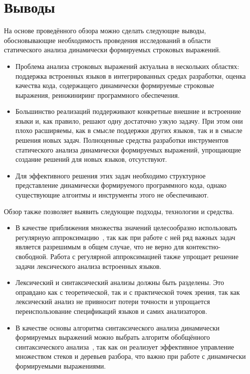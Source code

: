 \section{Выводы}

На основе проведённого обзора можно сделать следующие выводы, обосновывающие необходимость проведения исследований в области статического анализа динамически формируемых строковых выражений.

\begin{itemize}
    \item Проблема анализа строковых выражений актуальна в нескольких областях: поддержка встроенных языков в интегрированных средах разработки, оценка качества кода, содержащего динамически формируемые строковые выражения, реинжиниринг программного обеспечения.
    \item Большинство реализаций поддерживают конкретные внешние и встроенние языки и, как правило, решают одну достаточно узкую задачу. При этом они плохо расширяемы, как в смысле поддержки других языков, так и в смысле решения новых задач. Полноценные средства разработки инструментов статического анализа динамически формируемых выражений, упрощающие создание решений для новых языков, отсутствуют.
    \item Для эффективного решения этих задач необходимо структурное представление динамически формируемого программного кода, однако существующие алгоитмы и инструменты этого не обеспечивают.
\end{itemize}

Обзор также позволяет выявить следующие подходы, технологии и средства.

\begin{itemize}
    \item В качестве приближения множества значений целесообразно использовать регулярную аппроксимацию~\cite{JSA, RegOverApprox}, так как при работе с ней ряд важных задач является разрешимым в общем случае, что не верно для контекстно-свободной. Работа с регулярной аппроксимацией также упрощает решение задачи лексического анализа встроенных языков.
    \item Лексический и синтаксический анализы должны быть разделены. Это оправдано как с теоретической, так и с практической точек зрения, так как лексический анализ не привносит потери точности и упрощается переиспользование спецификаций языков и самих анализаторов. 
    \item В качестве основы алгоритма синтаксического анализа динамически формируемых выражений можно выбрать алгоритм обобщённого синтаксического анализа~\cite{GeneralisedlrBIG}, так как он реализует эффективное управление множеством стеков и деревьев разбора, что важно при работе с динамически формируемыми выражениями.
\end{itemize}
\clearpage
